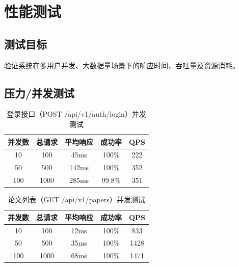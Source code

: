 
\section{性能测试}

\subsection{测试目标}

验证系统在多用户并发、大数据量场景下的响应时间、吞吐量及资源消耗。

\subsection{压力/并发测试}

\begin{table}[htbp]
    \centering
    \caption{登录接口（POST /api/v1/auth/login）并发测试}
    \begin{tabular}{|c|c|c|c|c|}
        \hline
        \textbf{并发数} & \textbf{总请求} & \textbf{平均响应} & \textbf{成功率} & \textbf{QPS} \\
        \hline
        10 & 100 & 45ms & 100\% & 222 \\
        \hline
        50 & 500 & 142ms & 100\% & 352 \\
        \hline
        100 & 1000 & 285ms & 99.8\% & 351 \\
        \hline
    \end{tabular}
\end{table}

\begin{table}[htbp]
    \centering
    \caption{论文列表（GET /api/v1/papers）并发测试}
    \begin{tabular}{|c|c|c|c|c|}
        \hline
        \textbf{并发数} & \textbf{总请求} & \textbf{平均响应} & \textbf{成功率} & \textbf{QPS} \\
        \hline
        10 & 100 & 12ms & 100\% & 833 \\
        \hline
        50 & 500 & 35ms & 100\% & 1428 \\
        \hline
        100 & 1000 & 68ms & 100\% & 1471 \\
        \hline
    \end{tabular}
\end{table}

